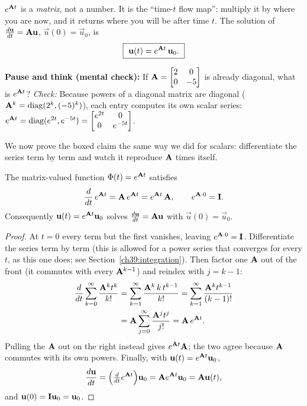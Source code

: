 \begin{focusbox}
$e^{\mathbf{A}t}$ is a \emph{matrix}, not a number. It is the ``time-$t$ flow
map'': multiply it by where you are now, and it returns where you will be after
time $t$. The
solution of $\frac{d\mathbf{u}}{dt}=\mathbf{A}\mathbf{u}$, $\vec{u}(0)=\vec{u}_0$, is
\[
  \boxed{\ \mathbf{u}(t) = e^{\mathbf{A}t}\,\mathbf{u}_0.\ }
\]
\end{focusbox}

\begin{recoverybox}
\textbf{Pause and think (mental check):} If $\mathbf{A} = \begin{bmatrix} 2 & 0 \\ 0 & -5 \end{bmatrix}$ is already diagonal, what is $e^{\mathbf{A}t}$?
\emph{Check:} Because powers of a diagonal matrix are diagonal ($\mathbf{A}^k = \operatorname{diag}(2^k, (-5)^k)$), each entry computes its own scalar series:
$e^{\mathbf{A}t} = \operatorname{diag}(e^{2t}, e^{-5t}) = \begin{bmatrix} e^{2t} & 0 \\ 0 & e^{-5t} \end{bmatrix}$.
\end{recoverybox}

We now prove the boxed claim the same way we did for scalars:
differentiate the series term by term and watch it reproduce $\mathbf{A}$ times
itself.

\begin{theorem}
\label{ch25:thm-solves}
The matrix-valued function $\Phi(t) = e^{\mathbf{A}t}$ satisfies
\[
  \frac{d}{dt}\,e^{\mathbf{A}t} = \mathbf{A}\,e^{\mathbf{A}t} = e^{\mathbf{A}t}\,\mathbf{A},
  \qquad e^{\mathbf{A}\cdot 0} = \mathbf{I}.
\]
Consequently $\mathbf{u}(t) = e^{\mathbf{A}t}\mathbf{u}_0$ solves
$\frac{d\mathbf{u}}{dt}=\mathbf{A}\mathbf{u}$ with $\vec{u}(0)=\vec{u}_0$.
\end{theorem}

\begin{proof}
At $t=0$ every term but the first vanishes, leaving $e^{\mathbf{A}\cdot 0}=\mathbf{I}$.
Differentiate the series term by term (this is allowed for a power series that
converges for every $t$, as this one does; see Section~\ref{ch39:integration}).
Then factor one $\mathbf{A}$ out of the front (it commutes with every
$\mathbf{A}^{k-1}$) and reindex with $j=k-1$:
\begin{align*}
  \frac{d}{dt}\sum_{k=0}^\infty \frac{\mathbf{A}^k t^k}{k!}
  &= \sum_{k=1}^\infty \frac{\mathbf{A}^k\, k\, t^{k-1}}{k!}
   = \sum_{k=1}^\infty \frac{\mathbf{A}^k t^{k-1}}{(k-1)!}\\
  &= \mathbf{A}\sum_{j=0}^\infty \frac{\mathbf{A}^j t^j}{j!}
   = \mathbf{A}\,e^{\mathbf{A}t}.
\end{align*}
Pulling the $\mathbf{A}$ out on the right instead gives $e^{\mathbf{A}t}\mathbf{A}$; the
two agree because $\mathbf{A}$ commutes with its own powers. Finally, with
$\mathbf{u}(t) = e^{\mathbf{A}t}\mathbf{u}_0$,
\[
  \frac{d\mathbf{u}}{dt} = \Bigl(\tfrac{d}{dt}e^{\mathbf{A}t}\Bigr)\mathbf{u}_0
  = \mathbf{A}e^{\mathbf{A}t}\mathbf{u}_0 = \mathbf{A}\mathbf{u}(t),
\]
and $\mathbf{u}(0)=\mathbf{I}\mathbf{u}_0=\mathbf{u}_0$.
\end{proof}

